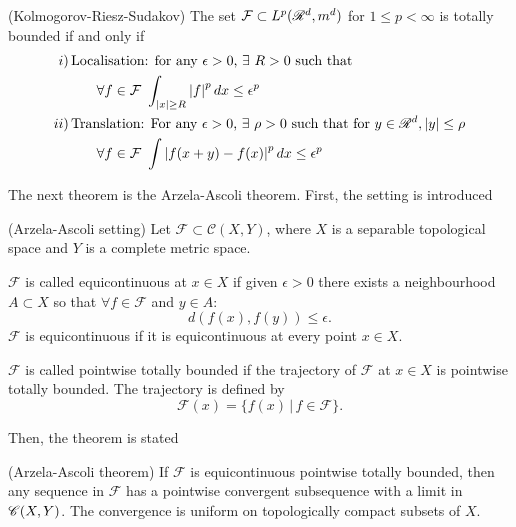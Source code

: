 \begin{definition}
\begin{definition}
\begin{theorem}(Kolmogorov-Riesz-Sudakov) \label{thm:Kolmogorov}
	The set $\mathcal{F} \subset L^p(\mathscr{R}^d, m^d)$ for $1 \leq p < \infty$ is totally bounded if and only if
	\begin{align}
		i) &\,\text{Localisation: for any $\epsilon > 0$, $\exists \,\, R > 0$ such that} \\
		& \quad \quad \forall f \in \mathcal{F} \,\, \int_{\left|x\right| \geq R} \left| f\right|^p dx \leq \epsilon^p \\
		ii) &\,\text{Translation: For any $\epsilon > 0$, $\exists\,\, \rho > 0$ such that for $y \in \mathscr{R}^d, \left|y\right| \leq \rho$}\\
			&\quad \quad \forall f \in \mathcal{F} \,\, \int \left| f(x+y) - f(x)\right|^p dx \leq \epsilon^p
	\end{align}
\end{theorem}

The next theorem is the Arzela-Ascoli theorem. First, the setting is introduced
\begin{definition}(Arzela-Ascoli setting) \label{Arzela_setting}
	Let $\mathcal{F} \subset \mathscr{C}(X,Y)$, where $X$ is a separable topological space and $Y$ is a complete metric space. 
	
	$\mathcal{F}$ is called equicontinuous at $x \in X$ if given $\epsilon > 0$ there exists a neighbourhood $A \subset X$ so that $\forall f \in \mathcal{F}$ and $y \in A$: 
	\begin{equation}
		d(f(x), f(y)) \leq \epsilon.
	\end{equation}
	$\mathcal{F}$ is equicontinuous if it is equicontinuous at every point $x \in X$. 
	
	
	$\mathcal{F}$ is called pointwise totally bounded if the trajectory of $\mathcal{F}$ at $x \in X$ is pointwise totally bounded. The trajectory is defined by 
	\begin{equation} \label{Arz_set:traj}
		\mathcal{F}(x) = \{f(x)  \, | \, f \in \mathcal{F}\}. 
	\end{equation}
\end{definition}
Then, the theorem is stated

\begin{theorem} (Arzela-Ascoli theorem)
	If $\mathcal{F}$ is equicontinuous pointwise totally bounded, then any sequence in $\mathcal{F}$ has a pointwise convergent subsequence with a limit in $\mathscr{C}(X,Y)$. The convergence is uniform on topologically compact subsets of $X$. 
\end{theorem}


\end{definition}
\end{definition}
